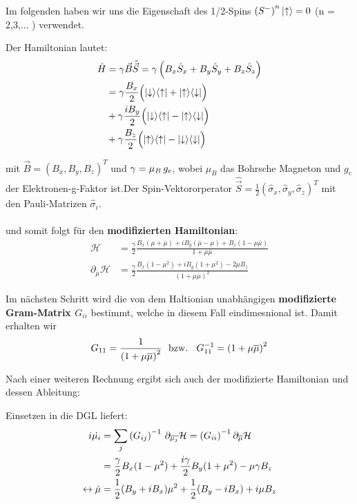 \documentclass[12pt]{article}
\def\muk{\overline{\mu}}
\begin{document}
\noindent Im folgenden haben wir uns die Eigenschaft des 1/2-Spins $\left(S^{-}\right)^{n}\ket{\uparrow}=0$  (n = 2,3,... ) verwendet.

Der Hamiltonian lautet:
\begin{align}
    \hat{H} &= \gamma \vec{B}\hat{\vec{S}} = \gamma\left(B_x\hat{S}_x+B_y\hat{S}_y+B_z\hat{S}_z \right) \\
    &= \gamma \frac{B_x}{2}\Bigl(\ket{\downarrow}\!\bra{\uparrow}+\ket{\uparrow}\!\bra{\downarrow}\Bigr) \\
    & + \gamma \frac{iB_y}{2}\Bigl(\ket{\downarrow}\!\bra{\uparrow}-\ket{\uparrow}\!\bra{\downarrow}\Bigr) \\
    & + \gamma \frac{B_z}{2}\Bigl(\ket{\uparrow}\!\bra{\uparrow}-\ket{\downarrow}\!\bra{\downarrow}\Bigr) 
\end{align}

\noindent mit $\vec{B} = (B_x,B_y,B_z)^T$ und $\gamma=\mu_B\thinspace g_e$, wobei $\mu_B$ das Bohrsche Magneton und $g_e$ 
der Elektronen-g-Faktor ist.Der Spin-Vektororperator 
$\hat{\vec{S}}= \frac{1}{2}\left(\hat{\sigma}_x,\hat{\sigma}_y,\hat{\sigma}_z\right)^T$ mit den Pauli-Matrizen $\hat{\sigma}_i$.\\ \\

und somit folgt für den \textbf{modifizierten Hamiltonian}:
\begin{align}
    \mathcal{H} &= \frac{\gamma}{2}\frac{B_x(\mu +\muk) + iB_y(\muk - \mu) + B_z(1-\mu\muk) }{1+\mu\muk}    \\
    \partial_{\muk} \mathcal{H} &= \frac{\gamma}{2} \frac{B_x(1-\mu^2) + iB_y(1+\mu^2) - 2\mu B_z}{(1+\mu\muk)^2} 
\end{align}

\noindent Im nächsten Schritt wird die von dem Haltionian unabhängigen \textbf{modifizierte Gram-Matrix $G_{ii}$} bestimmt, 
welche in diesem Fall eindimesnional ist.
Damit erhalten wir
\begin{align}
    G_{11} = \frac{1}{\left(1 + \mu\overline{\mu}\right)^2} \text{\space\space bzw.\space\space } G_{11}^{-1} = \left(1 + \mu\overline{\mu}\right)^2
\end{align}

\noindent Nach einer weiteren Rechnung ergibt sich auch der modifizierte Hamiltonian und dessen Ableitung:

\noindent Einsetzen in die DGL liefert:
\begin{align*}
    i\dot{\mu_i} &= \sum_{j}\left(G_{ij}\right)^{-1}\thinspace \partial_{\overline{\mu_j}}\mathcal{H} = \left(G_{ii}\right)^{-1}\partial_{\muk} \mathcal{H} \\
    &= \frac{\gamma}{2}B_x(1-\mu^2) + \frac{i\gamma}{2}B_y(1+\mu^2) -\mu \gamma B_z    \\
    \leftrightarrow \dot{\mu} &= \frac{1}{2}(B_y + iB_x)\mu^2 + \frac{1}{2}(B_y - iB_x) +i\mu B_z
\end{align*}
\end{document}
